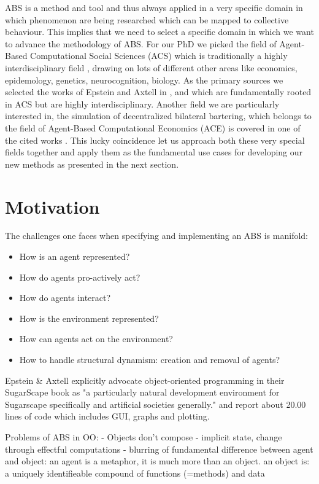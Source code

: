 ABS is a method and tool and thus always applied in a very specific domain in which phenomenon are being researched which can be mapped to collective behaviour. This implies that we need to select a specific domain in which we want to advance the methodology of ABS. For our PhD we picked the field of Agent-Based Computational Social Sciences (ACS) which is traditionally a highly interdisciplinary field \cite{axelrod_chapter_2006}, drawing on lots of different other areas like economics, epidemology, genetics, neurocognition, biology. As the primary sources we selected the works of Epstein and Axtell in \cite{epstein_growing_1996}, \cite{epstein_generative_2012} and \cite{epstein_agent_zero:_2014} which are fundamentally rooted in ACS but are highly interdisciplinary.
Another field we are particularly interested in, the simulation of decentralized bilateral bartering, which belongs to the field of Agent-Based Computational Economics (ACE) \cite{tesfatsion_agent-based_2006} is covered in one of the cited works \cite{epstein_growing_1996}. This lucky coincidence let us approach both these very special fields together and apply them as the fundamental use cases for developing our new methods as presented in the next section.


\section{Motivation}
The challenges one faces when specifying and implementing an ABS is manifold:
\begin{itemize}
	\item How is an agent represented?
	\item How do agents pro-actively act?
	\item How do agents interact?
	\item How is the environment represented?
	\item How can agents act on the environment?
	\item How to handle structural dynamism: creation and removal of agents?
\end{itemize}

Epstein \& Axtell explicitly advocate object-oriented programming in their SugarScape book as "a particularly natural development environment for Sugarscape specifically and artificial societies generally." and report about 20.00 lines of code which includes GUI, graphs and plotting.

Problems of ABS in OO:
- Objects don't compose
- implicit state, change through effectful computations
- blurring of fundamental difference between agent and object: an agent is a metaphor, it is much more than an object. an object is: a uniquely identifieable compound of functions (=methods) and data

